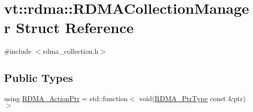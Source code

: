 \hypertarget{structvt_1_1rdma_1_1_r_d_m_a_collection_manager}{}\section{vt\+:\+:rdma\+:\+:R\+D\+M\+A\+Collection\+Manager Struct Reference}
\label{structvt_1_1rdma_1_1_r_d_m_a_collection_manager}


{\ttfamily \#include $<$rdma\+\_\+collection.\+h$>$}

\subsection*{Public Types}
\begin{DoxyCompactItemize}
\item 
using \hyperlink{structvt_1_1rdma_1_1_r_d_m_a_collection_manager_a4618a654161e92d2fcc2ab099eba9b65}{R\+D\+M\+A\+\_\+\+Action\+Ptr} = std\+::function$<$ void(\hyperlink{namespacevt_aab05b4a584f7ee835a6d0f66915cf59b}{R\+D\+M\+A\+\_\+\+Ptr\+Type} const  \&ptr)$>$
\end{DoxyCompactItemize}
